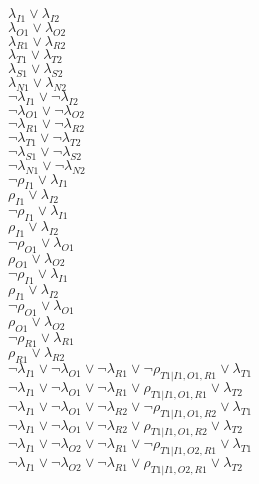 $\lambda_{I1} \vee \lambda_{I2}$\\
$\lambda_{O1} \vee \lambda_{O2}$\\
$\lambda_{R1} \vee \lambda_{R2}$\\
$\lambda_{T1} \vee \lambda_{T2}$\\
$\lambda_{S1} \vee \lambda_{S2}$\\
$\lambda_{N1} \vee \lambda_{N2}$\\
$\neg\lambda_{I1} \vee \neg\lambda_{I2}$\\
$\neg\lambda_{O1} \vee \neg\lambda_{O2}$\\
$\neg\lambda_{R1} \vee \neg\lambda_{R2}$\\
$\neg\lambda_{T1} \vee \neg\lambda_{T2}$\\
$\neg\lambda_{S1} \vee \neg\lambda_{S2}$\\
$\neg\lambda_{N1} \vee \neg\lambda_{N2}$\\
$\neg\rho_{I1} \vee \lambda_{I1}$\\
$\rho_{I1} \vee \lambda_{I2}$\\
$\neg\rho_{I1} \vee \lambda_{I1}$\\
$\rho_{I1} \vee \lambda_{I2}$\\
$\neg\rho_{O1} \vee \lambda_{O1}$\\
$\rho_{O1} \vee \lambda_{O2}$\\
$\neg\rho_{I1} \vee \lambda_{I1}$\\
$\rho_{I1} \vee \lambda_{I2}$\\
$\neg\rho_{O1} \vee \lambda_{O1}$\\
$\rho_{O1} \vee \lambda_{O2}$\\
$\neg\rho_{R1} \vee \lambda_{R1}$\\
$\rho_{R1} \vee \lambda_{R2}$\\
$\neg\lambda_{I1} \vee \neg\lambda_{O1} \vee \neg\lambda_{R1} \vee \neg\rho_{T1|I1,O1,R1} \vee \lambda_{T1}$\\
$\neg\lambda_{I1} \vee \neg\lambda_{O1} \vee \neg\lambda_{R1} \vee \rho_{T1|I1,O1,R1} \vee \lambda_{T2}$\\
$\neg\lambda_{I1} \vee \neg\lambda_{O1} \vee \neg\lambda_{R2} \vee \neg\rho_{T1|I1,O1,R2} \vee \lambda_{T1}$\\
$\neg\lambda_{I1} \vee \neg\lambda_{O1} \vee \neg\lambda_{R2} \vee \rho_{T1|I1,O1,R2} \vee \lambda_{T2}$\\
$\neg\lambda_{I1} \vee \neg\lambda_{O2} \vee \neg\lambda_{R1} \vee \neg\rho_{T1|I1,O2,R1} \vee \lambda_{T1}$\\
$\neg\lambda_{I1} \vee \neg\lambda_{O2} \vee \neg\lambda_{R1} \vee \rho_{T1|I1,O2,R1} \vee \lambda_{T2}$\\
